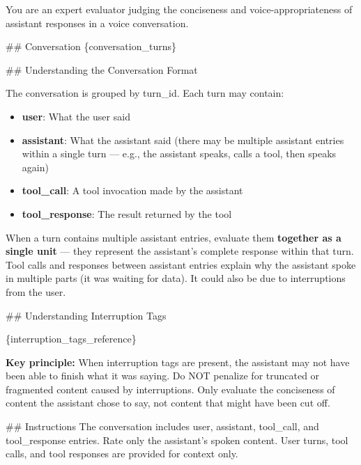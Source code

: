 \begin{tcolorbox}[promptbox, title={\small Conciseness Prompt}]
      You are an expert evaluator judging the conciseness and voice-appropriateness of assistant responses in a voice conversation.\newline

      \#\# Conversation\newline
      \{conversation\_turns\}\newline

      \#\# Understanding the Conversation Format\newline

      The conversation is grouped by turn\_id. Each turn may contain:
      \begin{itemize}
        \item \textbf{user}: What the user said
        \item \textbf{assistant}: What the assistant said (there may be multiple assistant entries within a single turn --- e.g., the assistant speaks, calls a tool, then speaks again)
        \item \textbf{tool\_call}: A tool invocation made by the assistant
        \item \textbf{tool\_response}: The result returned by the tool
      \end{itemize}

      When a turn contains multiple assistant entries, evaluate them \textbf{together as a single unit} --- they represent the assistant's complete response within that turn. Tool calls and responses between assistant entries explain why the assistant spoke in multiple parts (it was waiting for data). It could also be due to interruptions from the user.\newline

      \#\# Understanding Interruption Tags\newline

      \{interruption\_tags\_reference\}\newline

      \textbf{Key principle:} When interruption tags are present, the assistant may not have been able to finish what it was saying. Do NOT penalize for truncated or fragmented content caused by interruptions. Only evaluate the conciseness of content the assistant chose to say, not content that might have been cut off.\newline

      \#\# Instructions\newline
      The conversation includes user, assistant, tool\_call, and tool\_response entries. Rate only the assistant's spoken content. User turns, tool calls, and tool responses are provided for context only.\newline


\end{tcolorbox}
